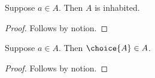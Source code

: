 

\begin{proposition}\label{horn_choice_inhabited}
    Suppose $a\in A$.
    Then $A$ is inhabited.
\end{proposition}
\begin{proof}
    Follows by notion.
\end{proof}

\begin{proposition}\label{horn_choice_member}
    Suppose $a\in A$.
    Then $\choice{A}\in A$.
\end{proposition}
\begin{proof}
    Follows by notion.
\end{proof}
